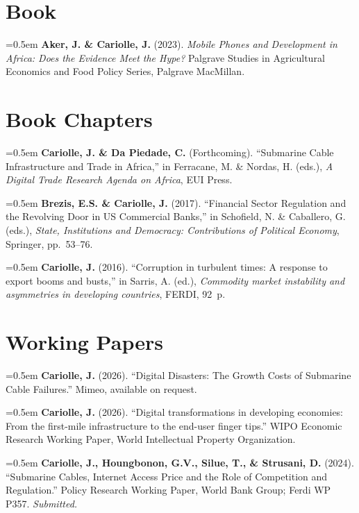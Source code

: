 \documentclass[11pt, a4paper]{article}
\newcommand{\cvpub}[1]{\noindent\hangindent=0.5em\hangafter=1 #1\par\vspace{5pt}}
\begin{document}
\section{Book}

\cvpub{\textbf{Aker, J. \& Cariolle, J.} (2023). \textit{Mobile Phones and Development in Africa: Does the Evidence Meet the Hype?} Palgrave Studies in Agricultural Economics and Food Policy Series, Palgrave MacMillan.}

\section{Book Chapters}

\cvpub{\textbf{Cariolle, J. \& Da Piedade, C.} (Forthcoming). ``Submarine Cable Infrastructure and Trade in Africa,'' in Ferracane, M. \& Nordas, H. (eds.), \textit{A Digital Trade Research Agenda on Africa}, EUI Press.}

\cvpub{\textbf{Brezis, E.S. \& Cariolle, J.} (2017). ``Financial Sector Regulation and the Revolving Door in US Commercial Banks,'' in Schofield, N. \& Caballero, G. (eds.), \textit{State, Institutions and Democracy: Contributions of Political Economy}, Springer, pp.~53--76.}

\cvpub{\textbf{Cariolle, J.} (2016). ``Corruption in turbulent times: A response to export booms and busts,'' in Sarris, A. (ed.), \textit{Commodity market instability and asymmetries in developing countries}, FERDI, 92~p.}

\section{Working Papers}

\cvpub{\textbf{Cariolle, J.} (2026). ``Digital Disasters: The Growth Costs of Submarine Cable Failures.'' Mimeo, available on request.}

\cvpub{\textbf{Cariolle, J.} (2026). ``Digital transformations in developing economies: From the first-mile infrastructure to the end-user finger tips.'' WIPO Economic Research Working Paper, World Intellectual Property Organization.}

\cvpub{\textbf{Cariolle, J., Houngbonon, G.V., Silue, T., \& Strusani, D.} (2024). ``Submarine Cables, Internet Access Price and the Role of Competition and Regulation.'' Policy Research Working Paper, World Bank Group; Ferdi WP P357. \textit{Submitted.}}
\end{document}
